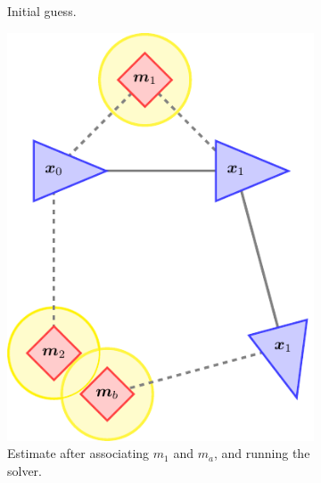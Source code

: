 \begin{figure}[htbp!]
\begin{subfigure}[htbp!]{0.25\textwidth}
    \caption{Initial guess.}
    \end{subfigure}\hspace{2em}
    \begin{subfigure}[htbp!]{0.25\textwidth} 
        \centering
        \includegraphics[width=\textwidth]{tikz/incremental2.pdf}
        \caption{Estimate after associating $m_1$ and $m_a$, and running the solver.}
    \end{subfigure}\hspace{2em}
    \begin{subfigure}[htbp!]{0.25\textwidth} 
        \centering

\end{subfigure}
\end{figure}
